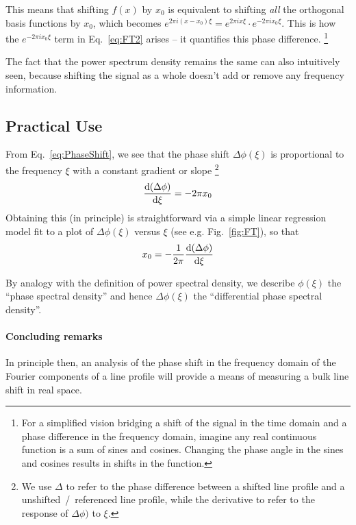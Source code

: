 This means that shifting $f(x)$ by $x_0$ is equivalent to shifting \textit{all} the orthogonal basis functions by $x_0$, which becomes $e^{2 \pi i(x-x_0) \xi} = e^{2 \pi i x \xi} \cdot e^{-2 \pi ix_0 \xi}$. This is how the $e^{-2 \pi ix_0 \xi}$ term in Eq.~\ref{eq:FT2} arises -- it quantifies this phase difference. 
\footnote{For a simplified vision bridging a shift of the signal in the time domain and a phase difference in the frequency domain, imagine any real continuous function is a sum of sines and cosines. Changing the phase angle in the sines and cosines results in shifts in the function.}

The fact that the power spectrum density remains the same can also intuitively seen, because shifting the signal as a whole 
doesn't add or remove any frequency information. 


\subsection{Practical Use}

From Eq.~\ref{eq:PhaseShift}, we see that the phase shift $\Delta \phi(\xi)$ is proportional to the frequency $\xi$
with a constant gradient or slope 
\footnote{We use $\Delta$ to refer to the phase difference between a shifted line profile and a unshifted~/~referenced line profile, while the derivative to refer to the response of $\Delta \phi)$ to $\xi$.}
\begin{equation}
	\dv{(\Delta \phi)}{\xi} = -2 \pi x_0
\label{eq:gradient}
\end{equation}
Obtaining this (in principle) is straightforward via a simple linear regression model fit to a plot of $\Delta \phi(\xi)$ versus $\xi$ 
 (see e.g. Fig.~\ref{fig:FT}), so that
\begin{equation}
	x_0 = -\frac{1}{2 \pi}\dv{(\Delta \phi)}{\xi}
\label{eq:line_shift}
\end{equation}

By analogy with the definition of power spectral density, we describe $\phi(\xi)$ the ``phase spectral density'' and hence $\Delta \phi(\xi)$ the ``differential phase spectral density''. 

\paragraph{Concluding remarks}
In principle then, an  analysis of the phase shift in the frequency domain of the Fourier components of
a line profile will provide a means of measuring a bulk line shift in real space. 


